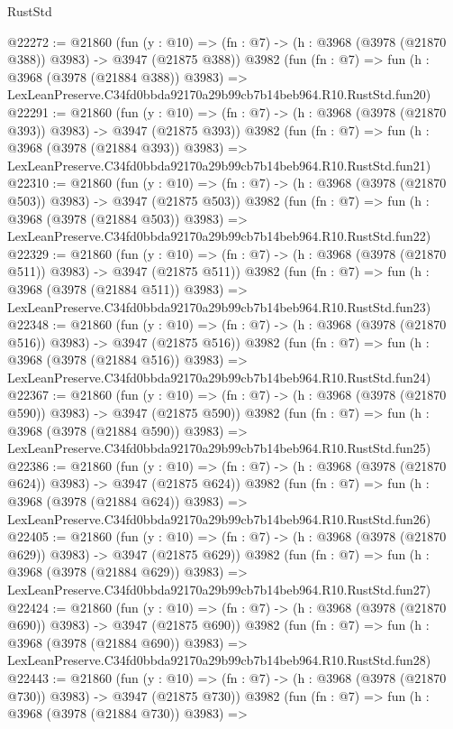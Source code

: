 \begin{lexlean}{RustStd}
\begin{coremodule}
@22272 := @21860
    (fun (y : @10) => (fn : @7) -> (h : @3968 (@3978 (@21870 @388)) @3983) -> @3947 (@21875 @388))
    @3982
    (fun (fn : @7) =>
    fun (h : @3968 (@3978 (@21884 @388)) @3983) =>
    LexLeanPreserve.C34fd0bbda92170a29b99cb7b14beb964.R10.RustStd.fun20)
@22291 := @21860
    (fun (y : @10) => (fn : @7) -> (h : @3968 (@3978 (@21870 @393)) @3983) -> @3947 (@21875 @393))
    @3982
    (fun (fn : @7) =>
    fun (h : @3968 (@3978 (@21884 @393)) @3983) =>
    LexLeanPreserve.C34fd0bbda92170a29b99cb7b14beb964.R10.RustStd.fun21)
@22310 := @21860
    (fun (y : @10) => (fn : @7) -> (h : @3968 (@3978 (@21870 @503)) @3983) -> @3947 (@21875 @503))
    @3982
    (fun (fn : @7) =>
    fun (h : @3968 (@3978 (@21884 @503)) @3983) =>
    LexLeanPreserve.C34fd0bbda92170a29b99cb7b14beb964.R10.RustStd.fun22)
@22329 := @21860
    (fun (y : @10) => (fn : @7) -> (h : @3968 (@3978 (@21870 @511)) @3983) -> @3947 (@21875 @511))
    @3982
    (fun (fn : @7) =>
    fun (h : @3968 (@3978 (@21884 @511)) @3983) =>
    LexLeanPreserve.C34fd0bbda92170a29b99cb7b14beb964.R10.RustStd.fun23)
@22348 := @21860
    (fun (y : @10) => (fn : @7) -> (h : @3968 (@3978 (@21870 @516)) @3983) -> @3947 (@21875 @516))
    @3982
    (fun (fn : @7) =>
    fun (h : @3968 (@3978 (@21884 @516)) @3983) =>
    LexLeanPreserve.C34fd0bbda92170a29b99cb7b14beb964.R10.RustStd.fun24)
@22367 := @21860
    (fun (y : @10) => (fn : @7) -> (h : @3968 (@3978 (@21870 @590)) @3983) -> @3947 (@21875 @590))
    @3982
    (fun (fn : @7) =>
    fun (h : @3968 (@3978 (@21884 @590)) @3983) =>
    LexLeanPreserve.C34fd0bbda92170a29b99cb7b14beb964.R10.RustStd.fun25)
@22386 := @21860
    (fun (y : @10) => (fn : @7) -> (h : @3968 (@3978 (@21870 @624)) @3983) -> @3947 (@21875 @624))
    @3982
    (fun (fn : @7) =>
    fun (h : @3968 (@3978 (@21884 @624)) @3983) =>
    LexLeanPreserve.C34fd0bbda92170a29b99cb7b14beb964.R10.RustStd.fun26)
@22405 := @21860
    (fun (y : @10) => (fn : @7) -> (h : @3968 (@3978 (@21870 @629)) @3983) -> @3947 (@21875 @629))
    @3982
    (fun (fn : @7) =>
    fun (h : @3968 (@3978 (@21884 @629)) @3983) =>
    LexLeanPreserve.C34fd0bbda92170a29b99cb7b14beb964.R10.RustStd.fun27)
@22424 := @21860
    (fun (y : @10) => (fn : @7) -> (h : @3968 (@3978 (@21870 @690)) @3983) -> @3947 (@21875 @690))
    @3982
    (fun (fn : @7) =>
    fun (h : @3968 (@3978 (@21884 @690)) @3983) =>
    LexLeanPreserve.C34fd0bbda92170a29b99cb7b14beb964.R10.RustStd.fun28)
@22443 := @21860
    (fun (y : @10) => (fn : @7) -> (h : @3968 (@3978 (@21870 @730)) @3983) -> @3947 (@21875 @730))
    @3982
    (fun (fn : @7) =>
    fun (h : @3968 (@3978 (@21884 @730)) @3983) =>

\end{coremodule}
\end{lexlean}
